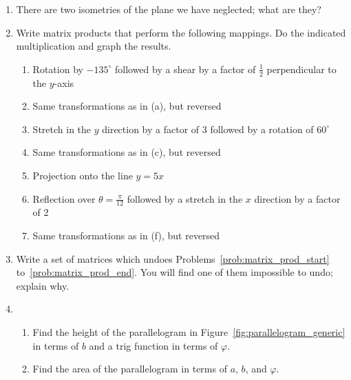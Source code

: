 \documentclass[../gatm_answers.tex]{subfiles}
\begin{document}
\begin{enumerate}
\item There are two isometries of the plane we have neglected; what are they?
\item Write matrix products that perform the following mappings. Do the indicated multiplication and graph the results.
\begin{enumerate}
\item Rotation by $-135^\circ$ followed by a shear by a factor of $\frac{1}{2}$ perpendicular to the $y$-axis \label{prob:matrix_prod_start}
\item Same transformations as in (a), but reversed
\item Stretch in the $y$ direction by a factor of $3$ followed by a rotation of $60^\circ$
\item Same transformations as in (c), but reversed
\item Projection onto the line $y=5x$
\item Reflection over $\theta=\frac{\pi}{12}$ followed by a stretch in the $x$ direction by a factor of $2$
\item Same transformations as in (f), but reversed \label{prob:matrix_prod_end}
\end{enumerate}
\item Write a set of matrices which undoes Problems~\ref{prob:matrix_prod_start} to~\ref{prob:matrix_prod_end}. You will find one of them impossible to undo; explain why.
\item \begin{enumerate}
\item Find the height of the parallelogram in Figure~\ref{fig:parallelogram_generic} in terms of $b$ and a trig function in terms of $\varphi$.
\item Find the area of the parallelogram in terms of $a$, $b$, and $\varphi$.
\end{enumerate}
\setcounter{problem_i}{\value{enumi}}
\end{enumerate}
\end{document}
